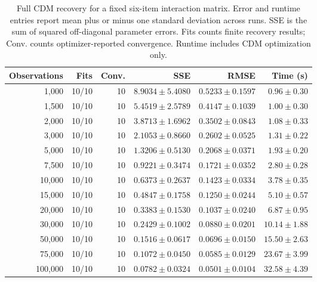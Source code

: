 \begin{table}
\caption{Full CDM recovery for a fixed six-item interaction matrix. Error and runtime entries report mean plus or minus one standard deviation across runs. SSE is the sum of squared off-diagonal parameter errors. Fits counts finite recovery results; Conv. counts optimizer-reported convergence. Runtime includes CDM optimization only.}
\label{tab:paper-synthetic-recovery}
\begin{tabular}{rrrrrr}
\toprule
Observations & Fits & Conv. & SSE & RMSE & Time (s) \\
\midrule
1,000 & 10/10 & 10 & $8.9034 \pm 5.4080$ & $0.5233 \pm 0.1597$ & $0.96 \pm 0.30$ \\
1,500 & 10/10 & 10 & $5.4519 \pm 2.5789$ & $0.4147 \pm 0.1039$ & $1.00 \pm 0.30$ \\
2,000 & 10/10 & 10 & $3.8713 \pm 1.6962$ & $0.3502 \pm 0.0843$ & $1.08 \pm 0.33$ \\
3,000 & 10/10 & 10 & $2.1053 \pm 0.8660$ & $0.2602 \pm 0.0525$ & $1.31 \pm 0.22$ \\
5,000 & 10/10 & 10 & $1.3206 \pm 0.5130$ & $0.2068 \pm 0.0371$ & $1.93 \pm 0.20$ \\
7,500 & 10/10 & 10 & $0.9221 \pm 0.3474$ & $0.1721 \pm 0.0352$ & $2.80 \pm 0.28$ \\
10,000 & 10/10 & 10 & $0.6373 \pm 0.2637$ & $0.1423 \pm 0.0334$ & $3.78 \pm 0.35$ \\
15,000 & 10/10 & 10 & $0.4847 \pm 0.1758$ & $0.1250 \pm 0.0244$ & $5.10 \pm 0.57$ \\
20,000 & 10/10 & 10 & $0.3383 \pm 0.1530$ & $0.1037 \pm 0.0240$ & $6.87 \pm 0.95$ \\
30,000 & 10/10 & 10 & $0.2429 \pm 0.1002$ & $0.0880 \pm 0.0201$ & $10.14 \pm 1.88$ \\
50,000 & 10/10 & 10 & $0.1516 \pm 0.0617$ & $0.0696 \pm 0.0150$ & $15.50 \pm 2.63$ \\
75,000 & 10/10 & 10 & $0.1072 \pm 0.0450$ & $0.0585 \pm 0.0129$ & $23.67 \pm 3.99$ \\
100,000 & 10/10 & 10 & $0.0782 \pm 0.0324$ & $0.0501 \pm 0.0104$ & $32.58 \pm 4.39$ \\
\bottomrule
\end{tabular}
\end{table}
